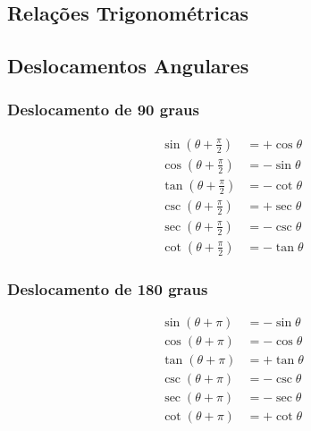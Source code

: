 \documentclass[
	article,			%
	12pt,				%
	twoside,			%
	a4paper,			%
	english,			%
	brazil,				%
	sumario=tradicional
	]{abntex2-modelo-notas-de-aula}
\begin{document}
\newpage
\pagestyle{plain}
%


%
%


\newpage
\pagestyle{notasUFSC}
\begin{apendicesenv}

\chapter{Relações Trigonométricas}

\section{Deslocamentos Angulares}
\subsection{Deslocamento de 90 graus}
\begin{eqnarray}
\sin(\theta + \tfrac{\pi}{2}) &= +\cos \theta \\
\cos(\theta + \tfrac{\pi}{2}) &= -\sin \theta \\
\tan(\theta + \tfrac{\pi}{2}) &= -\cot \theta \\
\csc(\theta + \tfrac{\pi}{2}) &= +\sec \theta \\
\sec(\theta + \tfrac{\pi}{2}) &= -\csc \theta \\
\cot(\theta + \tfrac{\pi}{2}) &= -\tan \theta
\end{eqnarray}

\subsection{Deslocamento de 180 graus}
\begin{eqnarray}
\sin(\theta + \pi) &= -\sin \theta \\
\cos(\theta + \pi) &= -\cos \theta \\
\tan(\theta + \pi) &= +\tan \theta \\
\csc(\theta + \pi) &= -\csc \theta \\
\sec(\theta + \pi) &= -\sec \theta \\
\cot(\theta + \pi) &= +\cot \theta 
\end{eqnarray}


\end{apendicesenv}
\end{document}
